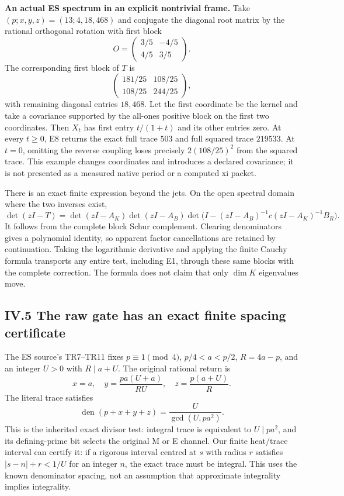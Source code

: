 \documentclass[11pt]{article}
\begin{document}
\textbf{An actual ES spectrum in an explicit nontrivial frame.} Take \((p;x,y,z)=(13;4,18,468)\) and conjugate the diagonal root matrix by the rational orthogonal rotation with first block \[
 O=\begin{pmatrix}3/5&-4/5\\4/5&3/5\end{pmatrix}.
\] The corresponding first block of \(T\) is \[
 \begin{pmatrix}181/25&108/25\\108/25&244/25\end{pmatrix},
\] with remaining diagonal entries \(18,468\). Let the first coordinate be the kernel and take a covariance supported by the all-ones positive block on the first two coordinates. Then \(X_t\) has first entry \(t/(1+t)\) and its other entries zero. At every \(t\ge0\), E8 returns the exact full trace \(503\) and full squared trace \(219533\). At \(t=0\), omitting the reverse coupling loses precisely \(2(108/25)^2\) from the squared trace. This example changes coordinates and introduces a declared covariance; it is not presented as a measured native period or a computed xi packet.

There is an exact finite expression beyond the jets. On the open spectral domain where the two inverses exist, \[
 \det(zI-T)=\det(zI-A_K)\det(zI-A_B)
 \det\bigl(I-(zI-A_B)^{-1}c(zI-A_K)^{-1}B_R\bigr).
 \tag{E9}
\] It follows from the complete block Schur complement. Clearing denominators gives a polynomial identity, so apparent factor cancellations are retained by continuation. Taking the logarithmic derivative and applying the finite Cauchy formula transports any entire test, including E1, through these same blocks with the complete correction. The formula does not claim that only \(\dim K\) eigenvalues move.

\subsection{IV.5 The raw gate has an exact finite spacing certificate}\label{iv.5-the-raw-gate-has-an-exact-finite-spacing-certificate}

The ES source's TR7--TR11 fixes \(p\equiv1\pmod4\), \(p/4<a<p/2\), \(R=4a-p\), and an integer \(U>0\) with \(R\mid a+U\). The original rational return is \[
 x=a,\quad y=\frac{pa(U+a)}{RU},\quad z=\frac{p(a+U)}R.
\] The literal trace satisfies \[
 \operatorname{den}(p+x+y+z)=\frac{U}{\gcd(U,pa^2)}.
 \tag{E10}
\] This is the inherited exact divisor test: integral trace is equivalent to \(U\mid pa^2\), and its defining-prime bit selects the original M or E channel. Our finite heat/trace interval can certify it: if a rigorous interval centred at \(s\) with radius \(r\) satisfies \(|s-n|+r<1/U\) for an integer \(n\), the exact trace must be integral. This uses the known denominator spacing, not an assumption that approximate integrality implies integrality.
\end{document}

